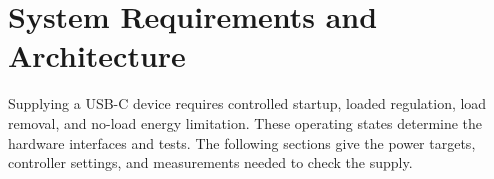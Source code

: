 \chapter{System Requirements and Architecture}
\label{ch:requirements}

Supplying a USB-C device requires controlled startup, loaded regulation, load removal, and no-load energy limitation. These operating states determine the hardware interfaces and tests. The following sections give the power targets, controller settings, and measurements needed to check the supply.










